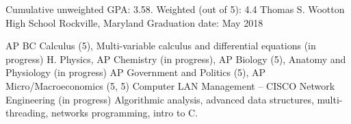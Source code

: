 

\begin{cventries}

  \cventry %
    {Cumulative unweighted GPA: 3.58. Weighted (out of 5): 4.4} %
    {Thomas S. Wootton High School} %
    {Rockville, Maryland} %
    {Graduation date: May 2018} %
    {
    \begin{cvsklist}
    	{ AP BC Calculus (5), Multi-variable calculus and differential equations (in progress)}
        {H. Physics, AP Chemistry (in progress), AP Biology (5), Anatomy and Physiology (in progress)}
        {AP Government and Politics (5), AP Micro/Macroeconomics (5, 5)}
        {Computer LAN Management – CISCO Network Engineering (in progress)}
        {Algorithmic analysis, advanced data structures, multi-threading, networks programming, intro to C.}
    \end{cvsklist}
    }

\end{cventries}
